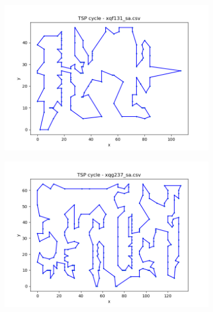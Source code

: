 \documentclass[12pt]{article}
\begin{document}
        \noindent\newline

        \begin{figure}[htpb]
        \centering
            \begin{subfigure}[b]{0.475\textwidth}
                \includegraphics[width=\linewidth]{img/xqf131_sa.png}
            \end{subfigure}
            \hfill
            \begin{subfigure}[b]{0.475\textwidth}
                \includegraphics[width=\linewidth]{img/xqg237_sa.png}
            \end{subfigure}
        \end{figure}
\end{document}
